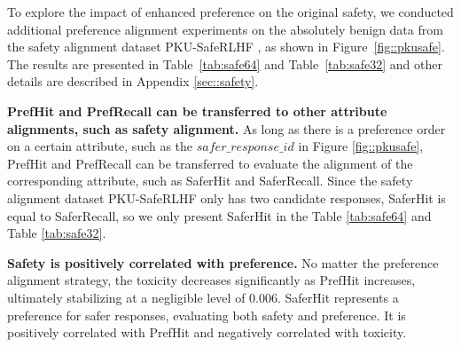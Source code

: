 To explore the impact of enhanced preference on the original safety, we conducted additional preference alignment experiments on the absolutely benign data from the safety alignment dataset PKU-SafeRLHF \cite{ji2024beavertails,ji2024pku}, as shown in Figure~\ref{fig::pkusafe}.
The results are presented in Table~\ref{tab:safe64} and Table~\ref{tab:safe32} and other details are described in Appendix \ref{sec::safety}. 

\textbf{PrefHit and PrefRecall can be transferred to other attribute alignments, such as safety alignment.}
As long as there is a preference order on a certain attribute, such as the \(safer\_response\_id\) in Figure \ref{fig::pkusafe}, PrefHit and PrefRecall can be transferred to evaluate the alignment of the corresponding attribute, such as SaferHit and SaferRecall. 
Since the safety alignment dataset PKU-SafeRLHF only has two candidate responses, SaferHit is equal to SaferRecall, so we only present SaferHit in the Table \ref{tab:safe64} and Table \ref{tab:safe32}.

\textbf{Safety is positively correlated with preference.} No matter the preference alignment strategy, the toxicity decreases significantly as PrefHit increases, ultimately stabilizing at a negligible level of 0.006. SaferHit represents a preference for safer responses, evaluating both safety and preference. It is positively correlated with PrefHit and negatively correlated with toxicity.


